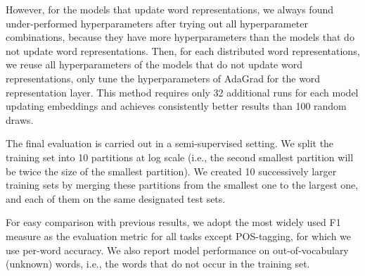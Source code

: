 However, for the models that update word representations, we always found under-performed hyperparameters after trying out all hyperparameter combinations, because they have more hyperparameters than the models that do not update word representations. Then, for each distributed word representations, we reuse all hyperparameters of the models that do not update word representations, only tune the hyperparameters of AdaGrad for the word representation layer. This method requires only 32 additional runs for each model updating embeddings and achieves consistently better results than 100 random draws.

The final evaluation is carried out in a semi-supervised setting. We split the training set into 10 partitions at log scale (i.e., the second smallest partition will be twice the size of the smallest partition). We created 10 successively larger training sets by merging these partitions from the smallest one to the largest one, and  each of them on the same designated test sets. 

For easy comparison with previous results, we adopt the most widely used F1 measure as the evaluation metric for all tasks except POS-tagging, for which we use per-word accuracy. We also report model performance on out-of-vocabulary (unknown) words, i.e., the words that do not occur in the training set.



